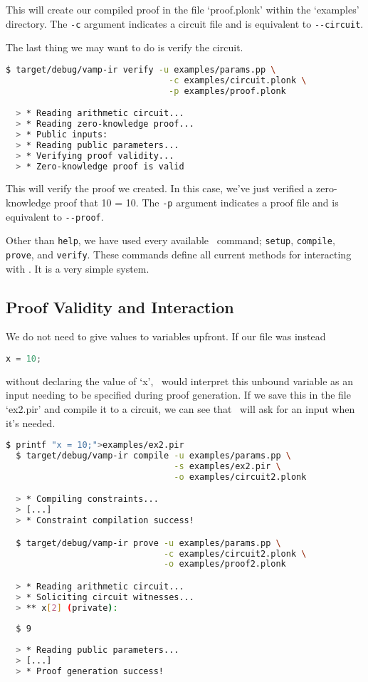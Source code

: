 This will create our compiled proof in the file `proof.plonk' within the `examples' directory. The \lstinline{-c} argument indicates a circuit file and is equivalent to \lstinline{--circuit}.

The last thing we may want to do is verify the circuit.

\begin{lstlisting}[language=bash]
  $ target/debug/vamp-ir verify -u examples/params.pp \
                                -c examples/circuit.plonk \
                                -p examples/proof.plonk

  > * Reading arithmetic circuit...
  > * Reading zero-knowledge proof...
  > * Public inputs:
  > * Reading public parameters...
  > * Verifying proof validity...
  > * Zero-knowledge proof is valid
\end{lstlisting}

This will verify the proof we created. In this case, we've just verified a zero-knowledge proof that 10 = 10. The \lstinline{-p} argument indicates a proof file and is equivalent to \lstinline{--proof}. 

Other than \lstinline{help}, we have used every available \vampir\ command; \lstinline{setup}, \lstinline{compile}, \lstinline{prove}, and \lstinline{verify}. These commands define all current methods for interacting with \vampir. It is a very simple system.

\subsection{Proof Validity and Interaction}

We do not need to give values to variables upfront. If our file was instead 

\begin{lstlisting}[language=Python, caption={}]
  x = 10;
\end{lstlisting}

without declaring the value of `x', \vampir\ would interpret this unbound variable as an input needing to be specified during proof generation. If we save this in the file `ex2.pir' and compile it to a circuit, we can see that \vampir\ will ask for an input when it's needed.


\begin{lstlisting}[language=bash]
  $ printf "x = 10;">examples/ex2.pir
  $ target/debug/vamp-ir compile -u examples/params.pp \
                                 -s examples/ex2.pir \
                                 -o examples/circuit2.plonk

  > * Compiling constraints...
  > [...]
  > * Constraint compilation success!

  $ target/debug/vamp-ir prove -u examples/params.pp \
                               -c examples/circuit2.plonk \
                               -o examples/proof2.plonk

  > * Reading arithmetic circuit...
  > * Soliciting circuit witnesses...
  > ** x[2] (private): 
  
  $ 9
  
  > * Reading public parameters...
  > [...]
  > * Proof generation success!
\end{lstlisting}


